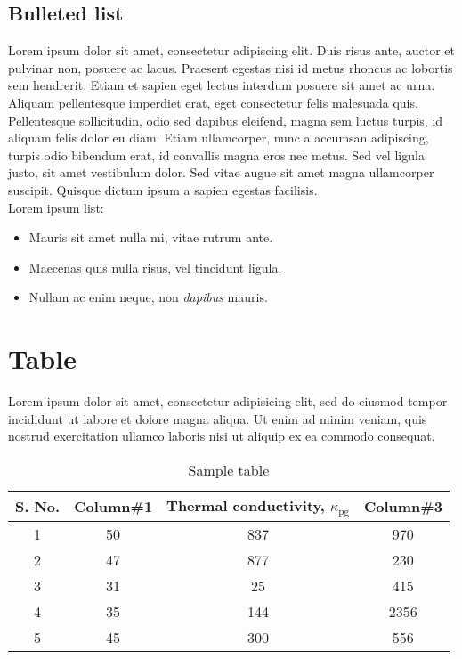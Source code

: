 \subsection{Bulleted list}
Lorem ipsum dolor sit amet, consectetur adipiscing elit. Duis risus ante, auctor et pulvinar non, posuere ac lacus. Praesent egestas nisi id metus rhoncus ac lobortis sem hendrerit. Etiam et sapien eget lectus interdum posuere sit amet ac urna. Aliquam pellentesque imperdiet erat, eget consectetur felis malesuada quis. Pellentesque sollicitudin, odio sed dapibus eleifend, magna sem luctus turpis, id aliquam felis dolor eu diam. Etiam ullamcorper, nunc a accumsan adipiscing, turpis odio bibendum erat, id convallis magna eros nec metus. Sed vel ligula justo, sit amet vestibulum dolor. Sed vitae augue sit amet magna ullamcorper suscipit. Quisque dictum ipsum a sapien egestas facilisis. \\ Lorem ipsum list:
\begin{itemize}
\item Mauris sit amet nulla mi, vitae rutrum ante.
\item Maecenas quis nulla risus, vel tincidunt ligula.
\item Nullam ac enim neque, non \emph{dapibus} mauris.
\end{itemize}

\section{Table}
Lorem ipsum dolor sit amet, consectetur adipisicing elit, sed do eiusmod tempor incididunt ut labore et dolore magna aliqua. Ut enim ad minim veniam, quis nostrud exercitation ullamco laboris nisi ut aliquip ex ea commodo consequat.

\begin{table}[ht]
\caption{Sample table} %
\centering %
\begin{tabular}{c c c c}
\hline\hline %
S. No. & Column\#1 & Thermal conductivity, $\kappa_\mathrm{pg}$ & Column\#3 \\ [0.5ex]
\hline %
1 & 50 & 837 & 970 \\
2 & 47 & 877 & 230 \\
3 & 31 & 25 & 415 \\
4 & 35 & 144 & 2356 \\
5 & 45 & 300 & 556 \\ [1ex] %
\hline %
\end{tabular}
\label{table:nonlin} %
\end{table}

